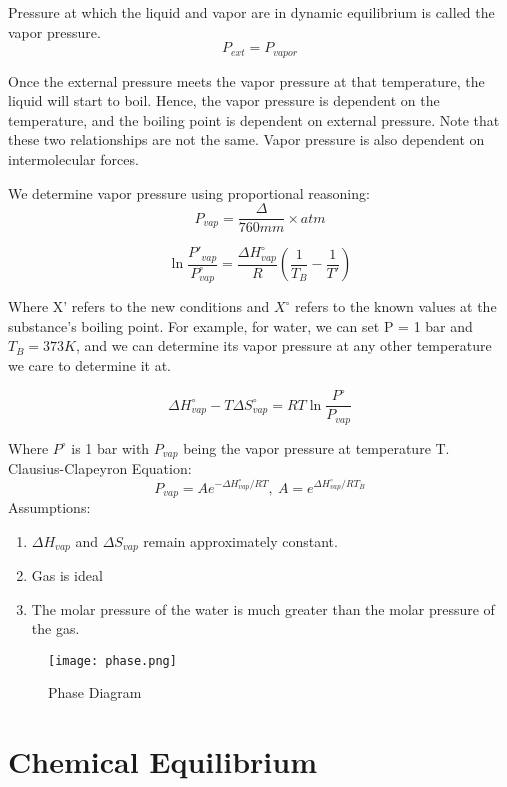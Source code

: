 \documentclass{article}
\begin{document}
Pressure at which the liquid and vapor are in dynamic equilibrium is called the vapor pressure. 
\[
P_{ext}=P_{vapor}
\]



Once the external pressure meets the vapor pressure at that temperature, the liquid will start to boil. Hence, the vapor pressure is dependent on the temperature, and the boiling point is dependent on external pressure. Note that these two relationships are not the same. Vapor pressure is also dependent on intermolecular forces.

We determine vapor pressure using proportional reasoning:
\[
P_{vap} = \frac{\Delta}{760mm} \times atm
\]


\[
\ln{\frac{P'_{vap}}{P^{\circ}_{vap}}} = \frac{\Delta H^{\circ}_{vap}}{R} (\frac{1}{T_B}-\frac{1}{T'})
\]

\begin{center}
Where X' refers to the new conditions and $X^{\circ}$ refers to the known values at the substance's boiling point. For example, for water, we can set P = 1 bar and $T_B = 373K$, and we can determine its vapor pressure at any other temperature we care to determine it at.
\end{center}

\[
\Delta H^{\circ}_{vap} - T \Delta S^{\circ}_{vap} = RT \ln \frac{P^{\circ}}{P_{vap}}
\]

Where $P^{\circ}$ is 1 bar with $P_{vap}$ being the vapor pressure at temperature T.\\


Clausius-Clapeyron Equation:
\[
P_{vap} = Ae^{-\Delta H^{\circ}_{vap}/RT},\ A=e^{\Delta H^{\circ}_{vap}/RT_B}
\]
Assumptions: 
\begin{enumerate}
\item$\Delta H_{vap}$ and $\Delta S_{vap}$ remain approximately constant.
\item Gas is ideal
\item The molar pressure of the water is much greater than the molar pressure of the gas. 
\end{enumerate}

\begin{figure}[hbt!]
\centering
\texttt{[image: phase.png]}
\caption{Phase Diagram}
\end{figure}

\section{Chemical Equilibrium}
\end{document}
